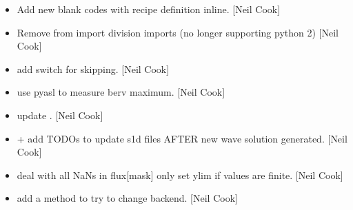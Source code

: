 \documentclass[a4paper,10pt,english]{report}
\begin{document}
\begin{itemize}
\item {} 
Add new blank codes with recipe definition inline. {[}Neil Cook{]}

\item {} 
Remove from  import division imports (no longer supporting
python 2) {[}Neil Cook{]}

\item {} 
 \sphinxhyphen{} add switch for skipping. {[}Neil Cook{]}

\item {} 
 \sphinxhyphen{} use pyasl to measure berv maximum.
{[}Neil Cook{]}

\item {} 
 \sphinxhyphen{} update . {[}Neil
Cook{]}

\item {} 
 +  \sphinxhyphen{} add
TODOs to update s1d files AFTER new wave solution generated. {[}Neil
Cook{]}

\item {} 
 \sphinxhyphen{} deal with all NaNs in flux{[}mask{]} \sphinxhyphen{}
only set ylim if values are finite. {[}Neil Cook{]}

\item {} 
 \sphinxhyphen{} add a  method to try to change
backend. {[}Neil Cook{]}

\end{itemize}
\end{document}
